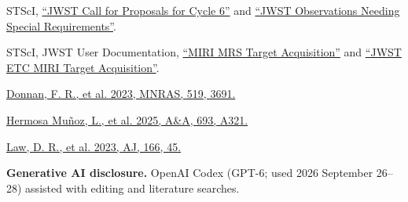 \documentclass[12pt]{article}
\begin{document}
\noindent [47] STScI, \href{https://jwst-docs.stsci.edu/jwst-opportunities-and-policies/jwst-call-for-proposals-for-cycle-6}{``JWST Call for Proposals for Cycle 6''} and \href{https://jwst-docs.stsci.edu/jwst-opportunities-and-policies/jwst-call-for-proposals-for-cycle-6/jwst-proposal-types-and-categories/jwst-observations-needing-special-requirements}{``JWST Observations Needing Special Requirements''}.\par
\noindent [48] STScI, JWST User Documentation, \href{https://jwst-docs.stsci.edu/jwst-mid-infrared-instrument/miri-operations/miri-target-acquisition/miri-mrs-target-acquisition}{``MIRI MRS Target Acquisition''} and \href{https://jwst-docs.stsci.edu/jwst-exposure-time-calculator-overview/jwst-etc-calculations-page-overview/jwst-etc-target-acquisition/jwst-etc-miri-target-acquisition}{``JWST ETC MIRI Target Acquisition''}.\par
\noindent [49] \href{https://academic.oup.com/mnras/article/519/3/3691/6948335}{Donnan, F. R., et al. 2023, MNRAS, 519, 3691.}\par
\noindent [50] \href{https://doi.org/10.1051/0004-6361/202452437}{Hermosa Mu\~noz, L., et al. 2025, A\&A, 693, A321.}\par
\noindent [51] \href{https://doi.org/10.3847/1538-3881/acdddc}{Law, D. R., et al. 2023, AJ, 166, 45.}\par

\noindent\textbf{Generative AI disclosure.} OpenAI Codex (GPT-6; used 2026 September 26--28) assisted with editing and literature searches.\par
\templateversion
\end{document}
